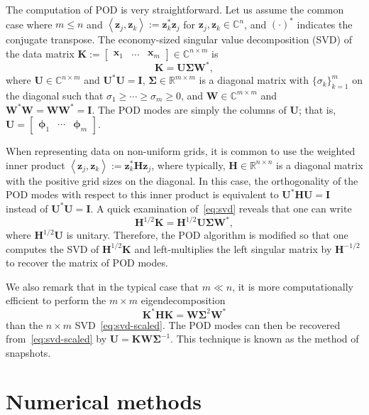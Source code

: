 \documentclass[11pt]{article}
\newcommand*{\Complex}{\mathbb{C}}
\newcommand*{\Reals}{\mathbb{R}}
\newcommand*{\half}{^{1/2}}
\newcommand*{\invhalf}{^{-1/2}}
\newcommand*{\ip}[2]{\left<#1, #2\right>}
\renewcommand*{\H}{\mathbf{H}}
\newcommand*{\I}{\mathbf{I}}
\newcommand*{\K}{\mathbf{K}}
\newcommand*{\U}{\mathbf{U}}
\newcommand*{\W}{\mathbf{W}}
\newcommand*{\SIGMA}{\mathbf{\Sigma}}
\newcommand*{\x}{\mathbf{x}}
\newcommand*{\z}{\mathbf{z}}
\newcommand*{\PHI}{\bm{\phi}}
\begin{document}
The computation of POD is very straightforward.
Let us assume the common case where $m \le n$ and $\ip{\z_j}{\z_k} := \z_k^* \z_j$ for $\z_j, \z_k \in \Complex^n$, and $(\cdot)^*$ indicates the conjugate transpose.
The economy-sized singular value decomposition (SVD) of the data matrix $\K := \begin{bmatrix} \x_1 & \ldots & \x_m \end{bmatrix} \in \Complex^{n \times m}$ is
\begin{equation}
    \label{eq:svd}
    \K = \U \SIGMA \W^*,
\end{equation}
where $\U \in \Complex^{n \times m}$ and $\U^* \U = \I$, $\SIGMA \in \Reals^{m \times m}$ is a diagonal matrix with $\{\sigma_k\}_{k=1}^m$ on the diagonal such that $\sigma_1 \ge \cdots \ge \sigma_m \ge 0$, and $\W \in \Complex^{m \times m}$ and $\W^* \W = \W \W^* = \I$.
The POD modes are simply the columns of $\U$; that is, $\U = \begin{bmatrix} \PHI_1 & \cdots & \PHI_m \end{bmatrix}$.

When representing data on non-uniform grids, it is common to use the weighted inner product $\ip{\z_j}{\z_k} := \z_k^* \H \z_j$, where typically, $\H \in \Reals^{n \times n}$ is a diagonal matrix with the positive grid sizes on the diagonal.
In this case, the orthogonality of the POD modes with respect to this inner product is equivalent to $\U^* \H \U = \I$ instead of $\U^* \U = \I$.
A quick examination of~\eqref{eq:svd} reveals that one can write
\begin{equation}
    \label{eq:svd-scaled}
    \H\half \K = \H\half \U \SIGMA \W^*,
\end{equation}
where $\H\half \U$ is unitary.
Therefore, the POD algorithm is modified so that one computes the SVD of $\H\half \K$ and left-multiplies the left singular matrix by $\H\invhalf$ to recover the matrix of POD modes.

We also remark that in the typical case that $m \ll n$, it is more computationally efficient to perform the $m \times m$ eigendecomposition
\begin{equation}
    \K^* \H \K = \W \SIGMA^2 \W^*
\end{equation}
than the $n \times m$ SVD~\eqref{eq:svd-scaled}.
The POD modes can then be recovered from~\eqref{eq:svd-scaled} by $\U = \K \W \SIGMA^{-1}$.
This technique is known as the method of snapshots.

\section{Numerical methods}
\label{sec:methods}
\end{document}
